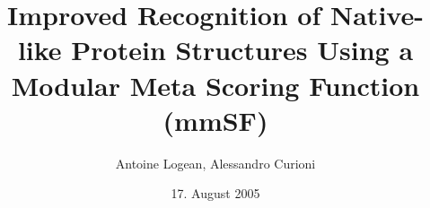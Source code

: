 \documentclass[a4paper,20pt,notitlepage,openbib]{article}
\begin{document}
\title{Improved Recognition of Native-like Protein Structures Using a Modular Meta Scoring Function (mmSF)}


\author{Antoine Logean, Alessandro Curioni }

\date{17. August 2005}

\maketitle
\end{document}
